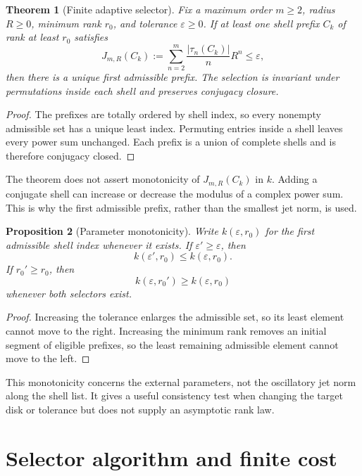 \documentclass[11pt]{article}
\newtheorem{theorem}{Theorem}[section]
\newtheorem{proposition}[theorem]{Proposition}
\theoremstyle{remark}
\begin{document}
\begin{theorem}[Finite adaptive selector]\label{thm:selector}
Fix a maximum order $m\ge2$, radius $R\ge0$, minimum rank $r_0$, and tolerance
$\varepsilon\ge0$.  If at least one shell prefix $C_k$ of rank at least
$r_0$ satisfies
\[
 J_{m,R}(C_k):=\sum_{n=2}^m\frac{|\tau_n(C_k)|}{n}R^n\le\varepsilon,
\]
then there is a unique first admissible prefix.  The selection is invariant
under permutations inside each shell and preserves conjugacy closure.
\end{theorem}

\begin{proof}
The prefixes are totally ordered by shell index, so every nonempty admissible
set has a unique least index.  Permuting entries inside a shell leaves every
power sum unchanged.  Each prefix is a union of complete shells and is
therefore conjugacy closed.
\end{proof}

The theorem does not assert monotonicity of $J_{m,R}(C_k)$ in $k$.  Adding a
conjugate shell can increase or decrease the modulus of a complex power sum.
This is why the first admissible prefix, rather than the smallest jet norm,
is used.

\begin{proposition}[Parameter monotonicity]\label{prop:parameters}
Write $k(\varepsilon,r_0)$ for the first admissible shell index whenever it
exists.  If $\varepsilon'\ge\varepsilon$, then
\[
 k(\varepsilon',r_0)\le k(\varepsilon,r_0).
\]
If $r_0'\ge r_0$, then
\[
 k(\varepsilon,r_0')\ge k(\varepsilon,r_0)
\]
whenever both selectors exist.
\end{proposition}

\begin{proof}
Increasing the tolerance enlarges the admissible set, so its least element
cannot move to the right.  Increasing the minimum rank removes an initial
segment of eligible prefixes, so the least remaining admissible element
cannot move to the left.
\end{proof}

This monotonicity concerns the external parameters, not the oscillatory jet
norm along the shell list.  It gives a useful consistency test when changing
the target disk or tolerance but does not supply an asymptotic rank law.

\section{Selector algorithm and finite cost}
\end{document}
